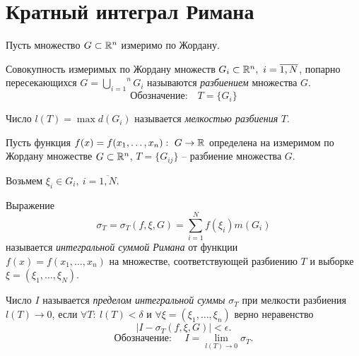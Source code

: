 

\section{Кратный интеграл Римана}

\begin{definition}
    Пусть множество $ G \subset \mathbb{R}^n $ измеримо по Жордану.

    Совокупность измеримых по Жордану множеств $ G_i \subset \mathbb{R}^n, \ i = \overline{1,N} $, попарно пересекающихся $ G = \overset{n}{\underset{i=1}{\bigcup}}G_i $ называются \emph{разбиением} множества $ G $.
    \[
        \text{Обозначение:}\quad T = \{G_i\}
    \]
\end{definition}

\begin{definition}
    Число $ l(T) = \max d(G_i) $ называется \emph{мелкостью разбиения} $ T $.
\end{definition}

\begin{definition}
    Пусть функция $ f(x) = f(x_1,\ldots,x_n): \ G \rightarrow \R $ определена на измеримом по Жордану множестве $ G \subset \mathbb{R}^n $, $T = \{G_{ij}\}$ -- разбиение множества $ G $.

    Возьмем $ \xi_i \in G_i, \ i = \overline{1,N} $.

    Выражение
    \[
        \sigma_T = \sigma_T(f,\xi,G) = \sum_{i=1}^{N}f(\xi_i)m(G_i)
    \]
    называется \emph{интегральной суммой Римана} от функции \\ $ f(x) = f(x_1,\ldots,x_n) $ на множестве, соответствующей разбиению $ T $ и выборке $ \xi = (\xi_1,\ldots,\xi_N) $.
\end{definition}

\begin{definition}
    Число $ I $ называется \emph{пределом интегральной суммы} $ \sigma_T $ при мелкости разбиения $ l(T)\rightarrow0 $, если $ \forall T: \ l(T) < \delta $ и $ \forall \xi = (\xi_1,\ldots,\xi_n) $ верно неравенство
    \[
        \big| I - \sigma_T(f,\xi,G) \big| < \epsilon.
    \]
    \[
        \text{Обозначение: }\quad I = \underset{l(T)\rightarrow0}{\lim}\sigma_T.
    \]
\end{definition}

